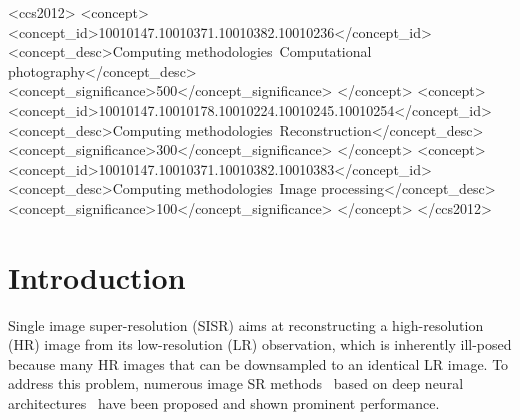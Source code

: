 \documentclass[sigconf]{acmart}
\begin{document}
\begin{CCSXML}
	<ccs2012>
	<concept>
	<concept_id>10010147.10010371.10010382.10010236</concept_id>
	<concept_desc>Computing methodologies~Computational photography</concept_desc>
	<concept_significance>500</concept_significance>
	</concept>
	<concept>
	<concept_id>10010147.10010178.10010224.10010245.10010254</concept_id>
	<concept_desc>Computing methodologies~Reconstruction</concept_desc>
	<concept_significance>300</concept_significance>
	</concept>
	<concept>
	<concept_id>10010147.10010371.10010382.10010383</concept_id>
	<concept_desc>Computing methodologies~Image processing</concept_desc>
	<concept_significance>100</concept_significance>
	</concept>
	</ccs2012>
\end{CCSXML}






\maketitle

\section{Introduction}\label{sec:introcution}
Single image super-resolution (SISR) aims at reconstructing a high-resolution (HR) image from its low-resolution (LR) observation, which is inherently ill-posed because many HR images that can be downsampled to an identical LR image. To address this problem, numerous image SR methods~\cite{VDSR,MemNet,SRDenseNet,RDN,IDN,RCAN} based on deep neural architectures~\cite{VGG,ResNet,DenseNet} have been proposed and shown prominent performance.
\end{document}
